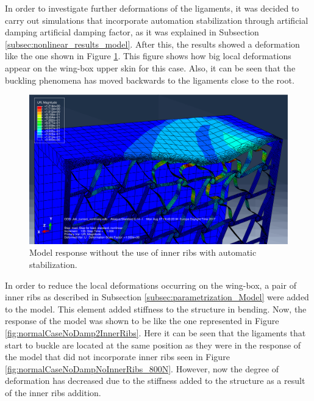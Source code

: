     In order to investigate further deformations of the ligaments, it was decided to carry out simulations that incorporate automation stabilization through artificial damping artificial damping factor, as it was explained in Subsection \ref{subsec:nonlinear_results_model}. After this, the results showed a deformation like the one shown in Figure \ref{fig:normalCaseDampNoInnerRibs}. This figure shows how big local deformations appear on the wing-box upper skin for this case. Also, it can be seen that the buckling phenomena has moved backwards to the ligaments close to the root.

    \begin{figure}[!htpb]
      \centering
      \includegraphics[width=0.8 \textwidth]{../figures/result-model/normalCaseDampNoInnerRibs}
      \caption[Model response without the use of inner ribs with automatic stabilization]{Model response without the use of inner ribs with automatic stabilization.}\label{fig:normalCaseDampNoInnerRibs}
    \end{figure}

    In order to reduce the local deformations occurring on the wing-box, a pair of inner ribs as described in Subsection \ref{subsec:parametrization_Model} were added to the model. This element added stiffness to the structure in bending. Now, the response of the model was shown to be like the one represented in Figure \ref{fig:normalCaseNoDamp2InnerRibs}. Here it can be seen that the ligaments that start to buckle are located at the same position as they were in the response of the model that did not incorporate inner ribs seen in Figure \ref{fig:normalCaseNoDampNoInnerRibs_800N}. However, now the degree of deformation has decreased due to the stiffness added to the structure as a result of the inner ribs addition.

